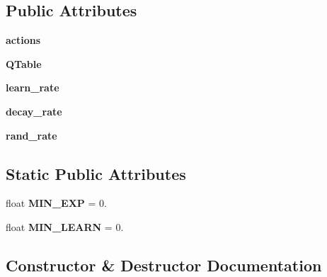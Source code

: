 \subsection*{Public Attributes}
\begin{DoxyCompactItemize}
\item 
{\bfseries actions}\hypertarget{classRLBrain_1_1RLBrain_afc5c3a7ca8959b8d9ae117f26ea6e3ce}{}\label{classRLBrain_1_1RLBrain_afc5c3a7ca8959b8d9ae117f26ea6e3ce}

\item 
{\bfseries Q\+Table}\hypertarget{classRLBrain_1_1RLBrain_a18b4f2777afa563eaa6989ab468e3192}{}\label{classRLBrain_1_1RLBrain_a18b4f2777afa563eaa6989ab468e3192}

\item 
{\bfseries learn\+\_\+rate}\hypertarget{classRLBrain_1_1RLBrain_a3b51c43b4123b2ba0dc6a5cfd300ebf3}{}\label{classRLBrain_1_1RLBrain_a3b51c43b4123b2ba0dc6a5cfd300ebf3}

\item 
{\bfseries decay\+\_\+rate}\hypertarget{classRLBrain_1_1RLBrain_abdfad2d282526a0e6211b17033b6c1ae}{}\label{classRLBrain_1_1RLBrain_abdfad2d282526a0e6211b17033b6c1ae}

\item 
{\bfseries rand\+\_\+rate}\hypertarget{classRLBrain_1_1RLBrain_aadeb48dfa9615e1fcad87e34f2aeb5c3}{}\label{classRLBrain_1_1RLBrain_aadeb48dfa9615e1fcad87e34f2aeb5c3}

\end{DoxyCompactItemize}
\subsection*{Static Public Attributes}
\begin{DoxyCompactItemize}
\item 
float {\bfseries M\+I\+N\+\_\+\+E\+XP} = 0.\hypertarget{classRLBrain_1_1RLBrain_a7a6679dda556a95a74c96a2b509b0a31}{}\label{classRLBrain_1_1RLBrain_a7a6679dda556a95a74c96a2b509b0a31}

\item 
float {\bfseries M\+I\+N\+\_\+\+L\+E\+A\+RN} = 0.\hypertarget{classRLBrain_1_1RLBrain_a122ac433b266b7b98100f554851e14e6}{}\label{classRLBrain_1_1RLBrain_a122ac433b266b7b98100f554851e14e6}

\end{DoxyCompactItemize}


\subsection{Constructor \& Destructor Documentation}

